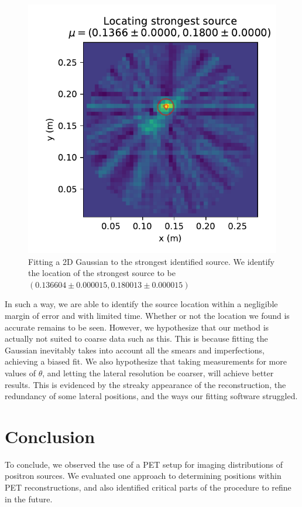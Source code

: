 \documentclass[12pt, letterpaper]{article}
\begin{document}
\begin{figure}
    \centering
    \includegraphics[width=0.75\linewidth]{experiment5/figures/challenge_fitting.pdf}
    \caption{Fitting a 2D Gaussian to the strongest identified source. We identify the location of the strongest source to be $(0.136604 \pm 0.000015, 0.180013 \pm 0.000015)$}
    \label{fig:challenge_fitting}
\end{figure}

In such a way, we are able to identify the source location within a negligible margin of error and with limited time. Whether or not the location we found is accurate remains to be seen. However, we hypothesize that our method is actually not suited to coarse data such as this. This is because fitting the Gaussian inevitably takes into account all the smears and imperfections, achieving a biased fit. We also hypothesize that taking measurements for more values of $\theta$, and letting the lateral resolution be coarser, will achieve better results. This is evidenced by the streaky appearance of the reconstruction, the redundancy of some lateral positions, and the ways our fitting software struggled. 

\section{Conclusion}

To conclude, we observed the use of a PET setup for imaging distributions of positron sources. We evaluated one approach to determining positions within PET reconstructions, and also identified critical parts of the procedure to refine in the future. 
\end{document}
